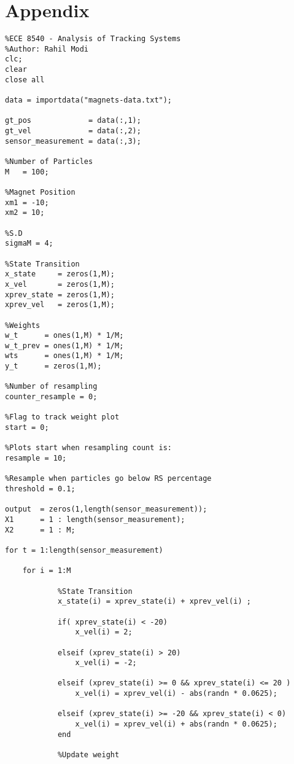 \documentclass[12pt]{article}
\begin{document}
\section{Appendix}
\begin{verbatim}
%ECE 8540 - Analysis of Tracking Systems 
%Author: Rahil Modi
clc;
clear
close all

data = importdata("magnets-data.txt");

gt_pos             = data(:,1);
gt_vel             = data(:,2);
sensor_measurement = data(:,3);

%Number of Particles
M   = 100;

%Magnet Position
xm1 = -10;
xm2 = 10;

%S.D
sigmaM = 4;

%State Transition
x_state     = zeros(1,M);
x_vel       = zeros(1,M);
xprev_state = zeros(1,M);
xprev_vel   = zeros(1,M);

%Weights
w_t      = ones(1,M) * 1/M;
w_t_prev = ones(1,M) * 1/M;
wts      = ones(1,M) * 1/M;
y_t      = zeros(1,M);

%Number of resampling 
counter_resample = 0;

%Flag to track weight plot
start = 0;

%Plots start when resampling count is:
resample = 10;

%Resample when particles go below RS percentage
threshold = 0.1;

output  = zeros(1,length(sensor_measurement));
X1      = 1 : length(sensor_measurement);
X2      = 1 : M;

for t = 1:length(sensor_measurement)
    
    for i = 1:M
            
            %State Transition
            x_state(i) = xprev_state(i) + xprev_vel(i) ;
            
            if( xprev_state(i) < -20)
                x_vel(i) = 2;
            
            elseif (xprev_state(i) > 20)
                x_vel(i) = -2;
            
            elseif (xprev_state(i) >= 0 && xprev_state(i) <= 20 ) 
                x_vel(i) = xprev_vel(i) - abs(randn * 0.0625);
            
            elseif (xprev_state(i) >= -20 && xprev_state(i) < 0)
                x_vel(i) = xprev_vel(i) + abs(randn * 0.0625);
            end
   
            %Update weight
            

\end{verbatim}
\end{document}
